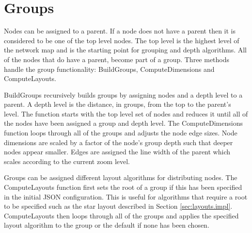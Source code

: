 \documentclass[11pt, a4paper]{report}
\begin{document}

\section{Groups}
\label{sec:groups.impl}

Nodes can be assigned to a parent. If a node does not have a parent then it is
considered to be one of the top level nodes. The top level is the highest level
of the network map and is the starting point for grouping and depth algorithms.
All of the nodes that do have a parent, become part of a group.  Three methods
handle the group functionality: BuildGroups, ComputeDimensions and
ComputeLayouts.

BuildGroups recursively builds groups by assigning nodes and a depth level to a
parent. A depth level is the distance, in groups, from the top to the parent's
level. The function starts with the top level set of nodes and reduces it until
all of the nodes have been assigned a group and depth level. The
ComputeDimensions function loops through all of the groups and adjusts the node
edge sizes. Node dimensions are scaled by a factor of the node's group depth
such that deeper nodes appear smaller. Edges are assigned the line width of the 
parent which scales according to the current zoom level.

Groups can be assigned different layout algorithms for distributing nodes. The
ComputeLayouts function first sets the root of a group if this has been
specified in the initial JSON configuration. This is useful for algorithms that
require a root to be specified such as the star layout described in Section
\ref{sec:layouts.impl}. ComputeLayouts then loops through all of the groups and
applies the specified layout algorithm to the group or the default if none has
been chosen. 
\end{document}
